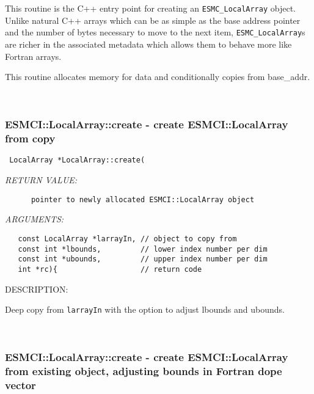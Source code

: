     This routine is the C++ entry point for creating an {\tt ESMC\_LocalArray}
    object.  Unlike natural C++ arrays which can be as simple as the
    base address pointer and the number of bytes necessary to move to
    the next item, {\tt ESMC\_LocalArray}s are richer in the associated metadata
    which allows them to behave more like Fortran arrays.
  
    This routine allocates memory for data and conditionally copies from
    base_addr.
   
 
\mbox{}\hrulefill\
 
\subsubsection [ESMCI::LocalArray::create] {ESMCI::LocalArray::create - create ESMCI::LocalArray from copy}


  
\begin{verbatim} LocalArray *LocalArray::create(\end{verbatim}{\em RETURN VALUE:}
\begin{verbatim}      pointer to newly allocated ESMCI::LocalArray object\end{verbatim}{\em ARGUMENTS:}
\begin{verbatim}   const LocalArray *larrayIn, // object to copy from
   const int *lbounds,         // lower index number per dim
   const int *ubounds,         // upper index number per dim
   int *rc){                   // return code\end{verbatim}
{\sf DESCRIPTION:\\ }


    Deep copy from {\tt larrayIn} with the option to adjust lbounds and ubounds.
   
 
\mbox{}\hrulefill\
 
\subsubsection [ESMCI::LocalArray::create] {ESMCI::LocalArray::create - create ESMCI::LocalArray from existing object, adjusting bounds in Fortran dope vector}


